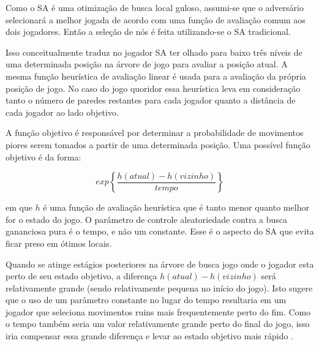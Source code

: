 Como o SA é uma otimização de busca local guloso, assumi-se que o adversário
selecionará a melhor jogada de acordo com uma função de avaliação comum aos dois
jogadores. Então a seleção de nós é feita utilizando-se o SA tradicional.

Isso conceitualmente traduz no jogador SA ter olhado para baixo três níveis de
uma determinada posição na árvore de jogo para avaliar a posição atual. A mesma
função heurística de avaliação linear é usada para a avaliação da própria
posição de jogo. No caso do jogo quoridor essa heurística leva em consideração
tanto o número de paredes restantes para cada jogador quanto a distância de cada
jogador ao lado objetivo.

A função objetivo é responsável por determinar a probabilidade de movimentos
piores serem tomados a partir de uma determinada posição. Uma possível função
objetivo é da forma:

\begin{equation}
  exp\left\{\frac{h(atual)- h(vizinho)}{tempo}\right\}
\end{equation}

em que $h$ é uma função de avaliação heurística que é tanto menor quanto melhor
for o estado do jogo. O parâmetro de controle aleatoriedade contra a busca
gananciosa pura é o tempo, e não um constante. Esse é o aspecto do SA que evita
ficar preso em ótimos locais.

Quando se atinge estágios posteriores na árvore de busca jogo onde o jogador
esta perto de seu estado objetivo, a diferença $h(atual)- h(vizinho)$
será relativamente grande (sendo relativamente pequena no início do jogo). Isto
sugere que o uso de um parâmetro constante no lugar do tempo resultaria em um
jogador que seleciona movimentos ruins mais frequentemente perto do fim.
Como o tempo também seria um valor relativamente grande perto do final do jogo,
isso iria compensar essa grande diferença e levar ao estado objetivo mais
rápido \cite{mcdermid2003gaquoridor}.

